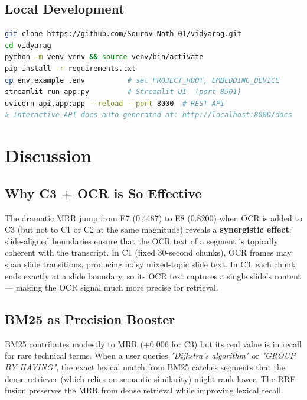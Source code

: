 \documentclass[12pt,a4paper]{article}
\begin{document}
\subsection{Local Development}

\begin{lstlisting}[language=bash]
git clone https://github.com/Sourav-Nath-01/vidyarag.git
cd vidyarag
python -m venv venv && source venv/bin/activate
pip install -r requirements.txt
cp env.example .env          # set PROJECT_ROOT, EMBEDDING_DEVICE
streamlit run app.py         # Streamlit UI  (port 8501)
uvicorn api.app:app --reload --port 8000  # REST API
# Interactive API docs auto-generated at: http://localhost:8000/docs
\end{lstlisting}

\newpage

\section{Discussion}

\subsection{Why C3 + OCR is So Effective}

The dramatic MRR jump from E7 (0.4487) to E8 (0.8200) when OCR is added to C3 (but not to C1 or C2 at the same magnitude) reveals a \textbf{synergistic effect}: slide-aligned boundaries ensure that the OCR text of a segment is topically coherent with the transcript. In C1 (fixed 30-second chunks), OCR frames may span slide transitions, producing noisy mixed-topic slide text. In C3, each chunk ends exactly at a slide boundary, so its OCR text captures a single slide's content — making the OCR signal much more precise for retrieval.

\subsection{BM25 as Precision Booster}

BM25 contributes modestly to MRR (+0.006 for C3) but its real value is in recall for rare technical terms. When a user queries \emph{"Dijkstra's algorithm"} or \emph{"GROUP BY HAVING"}, the exact lexical match from BM25 catches segments that the dense retriever (which relies on semantic similarity) might rank lower. The RRF fusion preserves the MRR from dense retrieval while improving lexical recall.
\end{document}
